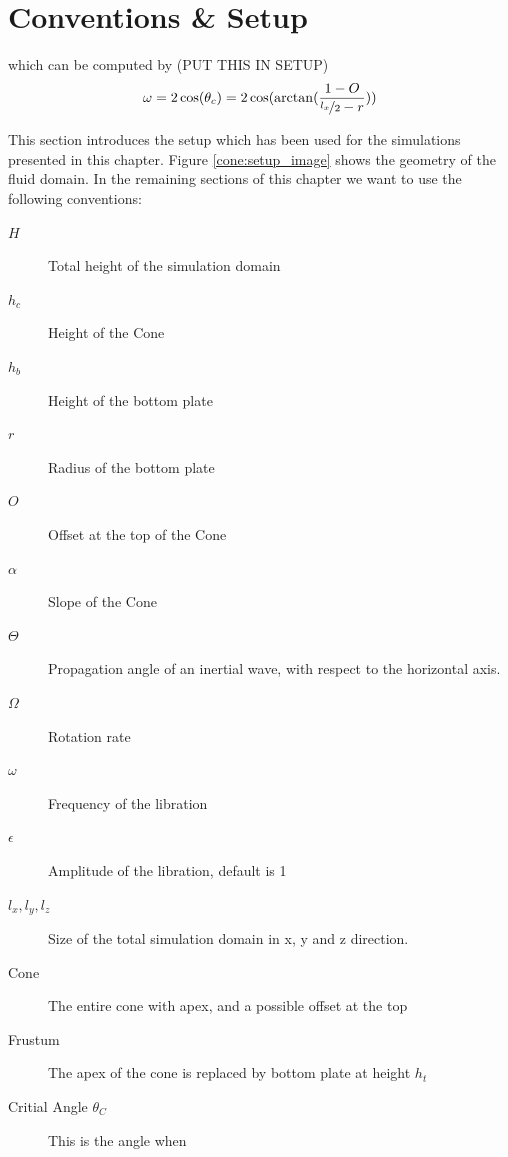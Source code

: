 \newpage

\section{Conventions \& Setup}
\label{cone:convsetup}

which can be computed by (PUT THIS IN SETUP)
\begin{align}
    \omega = 2\cos(\theta_c) = 2\cos(\arctan(\frac{1 - O}{\nicefrac{l_x}{2} - r}))
\end{align}

This section introduces the setup which has been used for the simulations presented in this chapter.
Figure \ref{cone:setup_image} shows the geometry of the fluid domain.
In the remaining sections of this chapter we want to use the following conventions:

\begin{multicols}{2}
\begin{description}
    \item[$H$]{Total height of the simulation domain}
    \item[$h_c$]{Height of the Cone}
    \item[$h_b$]{Height of the bottom plate}
    \item[$r$]{Radius of the bottom plate}
    \item[$O$]{Offset at the top of the Cone}
    \item[$\alpha$]{Slope of the Cone}
    \item[$\Theta$]{Propagation angle of an inertial wave, with respect to the horizontal axis.}
    \item[$\Omega$]{Rotation rate}
    \item[$\omega$]{Frequency of the libration}
    \item[$\epsilon$]{Amplitude of the libration, default is 1}%
    \item[$l_x, l_y, l_z$]{Size of the total simulation domain in x, y and z direction.}
    \item[Cone] {The entire cone with apex, and a possible offset at the top}
    \item[Frustum]{The apex of the cone is replaced by bottom plate at height $h_t$}
    \item[Critial Angle $\theta_C$]{This is the angle when}
\end{description}
\end{multicols}


